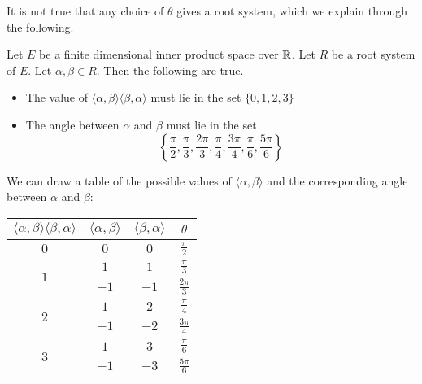 \documentclass[a4paper]{article}
\begin{document}
It is not true that any choice of $\theta$ gives a root system, which we explain through the following. 

\begin{lmm}{}{} Let $E$ be a finite dimensional inner product space over $\mathbb{R}$. Let $R$ be a root system of $E$. Let $\alpha,\beta\in R$. Then the following are true. 
\begin{itemize}
\item The value of $\langle\alpha,\beta\rangle\langle\beta,\alpha\rangle$ must lie in the set $\{0,1,2,3\}$
\item The angle between $\alpha$ and $\beta$ must lie in the set $$\left\{\frac{\pi}{2},\frac{\pi}{3},\frac{2\pi}{3},\frac{\pi}{4},\frac{3\pi}{4},\frac{\pi}{6},\frac{5\pi}{6}\right\}$$
\end{itemize}
\end{lmm}

We can draw a table of the possible values of $\langle\alpha,\beta\rangle$ and the corresponding angle between $\alpha$ and $\beta$: 

\begin{table}[!h]
\centering
\begin{tabular}{|c|c|c|c|}
\hline
$\langle\alpha,\beta\rangle\langle\beta,\alpha\rangle$ & $\langle\alpha,\beta\rangle$ & $\langle\beta,\alpha\rangle$ & $\theta$         \\ \hline
$0$                                                    & $0$                          & $0$                          & $\frac{\pi}{2}$  \\[1.5ex] \hline
\multirow{2}{*}{$1$}                                   & $1$                          & $1$                          & $\frac{\pi}{3}$  \\[1.5ex] \cline{2-4} 
                                                       & $-1$                         & $-1$                         & $\frac{2\pi}{3}$ \\[1.5ex] \hline
\multirow{2}{*}{$2$}                                   & $1$                          & $2$                          & $\frac{\pi}{4}$  \\[1.5ex] \cline{2-4} 
                                                       & $-1$                         & $-2$                         & $\frac{3\pi}{4}$ \\[1.5ex] \hline
\multirow{2}{*}{$3$}                                   & $1$                          & $3$                          & $\frac{\pi}{6}$  \\[1.5ex] \cline{2-4} 
                                                       & $-1$                         & $-3$                         & $\frac{5\pi}{6}$ \\[1.5ex] \hline
\end{tabular}
\end{table}
\end{document}
